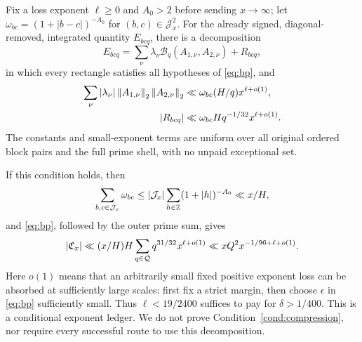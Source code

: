 \begin{condition}\label{cond:compression}
Fix a loss exponent $\ell\ge0$ and $A_0>2$ before sending $x\to\infty$; let
$\omega_{bc}=(1+|b-c|)^{-A_0}$ for $(b,c)\in\mathcal J_x^2$.
For the already signed, diagonal-removed, integrated quantity $E_{bcq}$, there is a decomposition
\[
E_{bcq}=\sum_\nu\lambda_\nu\mathcal B_q(A_{1,\nu},A_{2,\nu})+R_{bcq},
\]
in which every rectangle satisfies all hypotheses of \eqref{eq:bp}, and
\begin{align*}
\sum_\nu|\lambda_\nu|\left\|A_{1,\nu}\right\|_2\left\|A_{2,\nu}\right\|_2
&\ll\omega_{bc}(H/q)x^{\ell+o(1)},\\
|R_{bcq}|&\ll\omega_{bc}Hq^{-1/32}x^{\ell+o(1)}.
\end{align*}
The constants and small-exponent terms are uniform over all original ordered block pairs and the full prime shell, with no unpaid exceptional set.
\end{condition}
If this condition holds, then
\[
\sum_{b,c\in\mathcal J_x}\omega_{bc}
\le |\mathcal J_x|\sum_{h\in\mathbb Z}(1+|h|)^{-A_0}\ll x/H,
\]
and \eqref{eq:bp}, followed by the outer prime sum, gives
\[
|\mathfrak C_x|\ll (x/H)H\sum_{q\in\mathcal Q}q^{31/32}x^{\ell+o(1)}
\ll xQ^2x^{-1/96+\ell+o(1)}.
\]
Here $o(1)$ means that an arbitrarily small fixed positive exponent loss can be absorbed at sufficiently large scales: first fix a strict margin, then choose $\epsilon$ in \eqref{eq:bp} sufficiently small.
Thus $\ell<19/2400$ suffices to pay for $\delta>1/400$. This is a conditional exponent ledger. We do not prove Condition~\ref{cond:compression}, nor require every successful route to use this decomposition.
